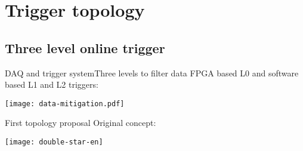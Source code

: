 \section{Trigger topology}

\subsection{Three level online trigger}

\begin{frame}{DAQ and trigger system}{Three levels to filter data}
	FPGA based L0 and software based L1 and L2 triggers:

	\begin{center} 
	\texttt{[image: data-mitigation.pdf]}
	\end{center}
\end{frame}

\begin{frame}{First topology proposal}{}
	Original concept:
	\begin{center} 
		\texttt{[image: double-star-en]}
	\end{center}
\end{frame}

	

